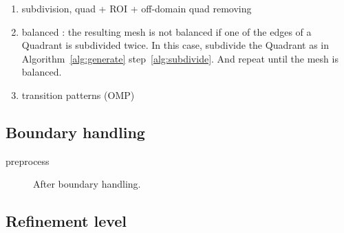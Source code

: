 \documentclass[10pt]{article}
\begin{document}
\begin{enumerate}
\item subdivision, quad + ROI + off-domain quad removing
\item balanced : the resulting mesh is not balanced if one of the edges of a Quadrant is subdivided twice. In this case, subdivide the Quadrant as in Algorithm~\ref{alg:generate} step~\ref{alg:subdivide}. And repeat until the mesh is balanced.
\item transition patterns (OMP)
\end{enumerate}

\subsection{Boundary handling}

preprocess

 \begin{figure}[htb]
\centering
\caption{After boundary handling.}
\label{fig:boundary}
\end{figure}

\subsection{Refinement level}
\end{document}
